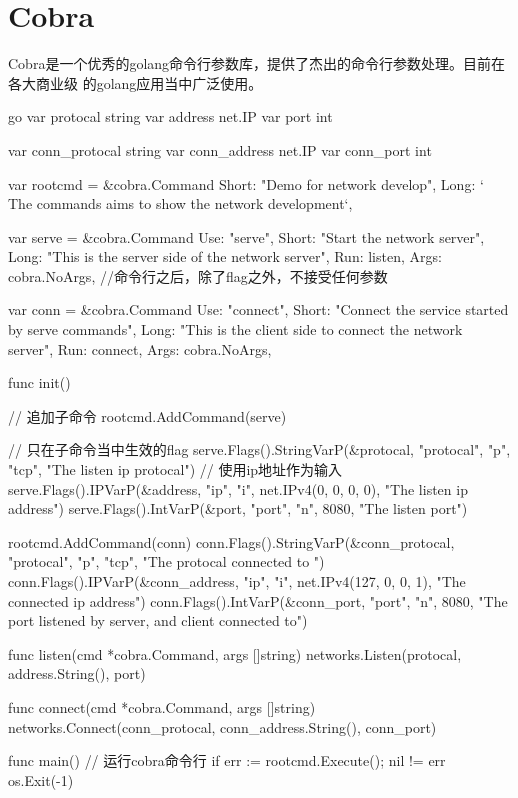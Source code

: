 \section{Cobra}
Cobra是一个优秀的golang命令行参数库，提供了杰出的命令行参数处理。目前在各大商业级
的golang应用当中广泛使用。
\begin{code-block}{go}
var protocal string
var address net.IP
var port int

var conn_protocal string
var conn_address net.IP
var conn_port int

var rootcmd = &cobra.Command{
    Short: "Demo for network develop",
    Long:  ` The commands aims to show the network development`,
}

var serve = &cobra.Command{
    Use:   "serve",
    Short: "Start the network server",
    Long:  "This is the server side of the network server",
    Run:   listen,
    Args:  cobra.NoArgs, //命令行之后，除了flag之外，不接受任何参数
}

var conn = &cobra.Command{
    Use:   "connect",
    Short: "Connect the service started by serve commands",
    Long:  "This is the client side to connect the network server",
    Run:   connect,
    Args:  cobra.NoArgs,
}

func init() {

    // 追加子命令
    rootcmd.AddCommand(serve)

    // 只在子命令当中生效的flag
    serve.Flags().StringVarP(&protocal, "protocal", "p",
        "tcp", "The listen ip protocal")
    // 使用ip地址作为输入
    serve.Flags().IPVarP(&address, "ip", "i",
        net.IPv4(0, 0, 0, 0), "The listen ip address")
    serve.Flags().IntVarP(&port, "port", "n",
        8080, "The listen port")

    rootcmd.AddCommand(conn)
    conn.Flags().StringVarP(&conn_protocal, "protocal", "p",
        "tcp", "The protocal connected to ")
    conn.Flags().IPVarP(&conn_address, "ip", "i",
        net.IPv4(127, 0, 0, 1), "The connected ip address")
    conn.Flags().IntVarP(&conn_port, "port", "n",
        8080, "The port listened by server, and client connected to")
}

func listen(cmd *cobra.Command, args []string) {
    networks.Listen(protocal, address.String(), port)
}

func connect(cmd *cobra.Command, args []string) {
    networks.Connect(conn_protocal, conn_address.String(), conn_port)
}

func main() {
    // 运行cobra命令行
    if err := rootcmd.Execute(); nil != err {
        os.Exit(-1)
    }
}
\end{code-block}

